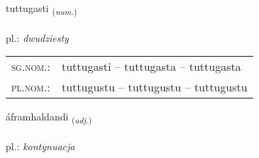 \documentclass[frontgrid, backgrid]{flacards}\usepackage[]{graphicx}\usepackage[]{xcolor}
\begin{document}
\renewcommand{\flhead}{\vskip5pt \fboxsep=0pt {\small\bfseries\footnotesize Töluorð | liczebnik}}
\renewcommand{\fcfoot}{\vskip5pt \fboxsep=0pt \hspace{2pt}{\small\bfseries\footnotesize 3K}}

\renewcommand{\blhead}{\vskip5pt {\small\bfseries\footnotesize Töluorð | liczebnik }}
\renewcommand{\bcfoot}{\vskip5pt \hspace{2pt}{\small\bfseries\footnotesize 3K}}


{tuttugasti \small{\textsubscript{(\textit{num.})}} \\[1ex] %
\textphonetic{[tʰʏhtʏɣastɪ]} \\
pl.: \emph{dwudziesty} \\  [2ex]
\renewcommand*{\arraystretch}{0.8}
\begin{tabular}{ll}
\textsc{sg.nom.}: & tuttugasti  --  tuttugasta -- tuttugasta \\ 
\textsc{pl.nom.}: & tuttugustu -- tuttugustu -- tuttugustu
\end{tabular}
}

\renewcommand{\flhead}{\vskip5pt \fboxsep=0pt {\small\bfseries\footnotesize Lýsingarorð | przymiotnik}}
\renewcommand{\fcfoot}{\vskip5pt \fboxsep=0pt \hspace{2pt}{\small\bfseries\footnotesize 3K}}

\renewcommand{\blhead}{\vskip5pt {\small\bfseries\footnotesize Lýsingarorð | przymiotnik }}
\renewcommand{\bcfoot}{\vskip5pt \hspace{2pt}{\small\bfseries\footnotesize 3K}}


{áframhaldandi \small{\textsubscript{(\textit{adj.})}} \\[1ex] %
\textphonetic{[auːframhaltantɪ]} \\
pl.: \emph{kontynuacja} \\  [2ex]
\renewcommand*{\arraystretch}{0.8}
}
\end{document}
